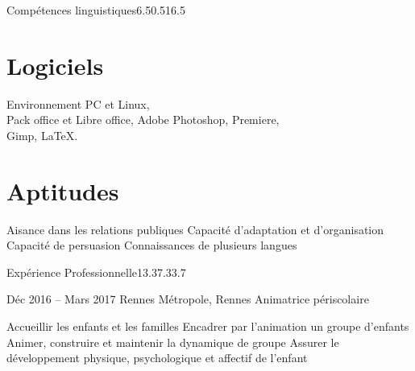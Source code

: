 \documentclass[30pt, french]{tccv}
\begin{document}
\begin{upshape}
\begin{rounded_frame}{Compétences linguistiques}{6.5}{0.5}{16.5}{}
\vspace{0.5cm}
\section{Logiciels}
Environnement PC et Linux, \\
Pack office et Libre office,
Adobe Photoshop, Premiere, \\
Gimp,
\LaTeX.

\vspace{0.5cm}
\section{Aptitudes}
\begin{itemize}[leftmargin=13pt]
  \setlength\itemsep{-3pt} 
  \cvitem[\checkmark]  Aisance dans les relations publiques
  \cvitem[\checkmark]  Capacité d'adaptation et d'organisation
  \cvitem[\checkmark]  Capacité de persuasion
  \cvitem[\checkmark]  Connaissances de plusieurs langues
\end{itemize}

\vspace{0.3cm}

\end{rounded_frame}




%
%


\begin{flat_frame}{Expérience Professionnelle}{13.3}{7.3}{3.7}{}
\begin{eventlist}


    
    
    
\item{Déc 2016 -- Mars 2017}
     {Rennes Métropole, Rennes}
     {Animatrice périscolaire}
     \fontsize{9pt}{1em}\color{text}\bodyfontlight\upshape\selectfont
    
    \begin{itemize}
      \cvitem[\checkmark] Accueillir les enfants et les familles                      
      \cvitem[\checkmark] Encadrer par l’animation un groupe d’enfants
      \cvitem[\checkmark] Animer, construire et maintenir la dynamique de groupe               
      \cvitem[\checkmark] Assurer le développement physique, psychologique et affectif de l’enfant                                            
    \end{itemize}     





\end{eventlist}
\end{flat_frame}
\end{upshape}
\end{document}

